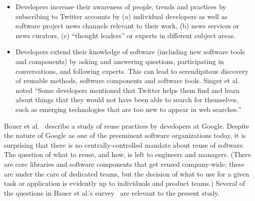 \documentclass{casicswhitepaper}
\begin{document}
\begin{itemize}

\item Developers increase their awareness of people, trends and practices by subscribing to Twitter accounts by (a) individual developers as well as software project news channels relevant to their work, (b) news services or news curators, (c) ``thought leaders'' or experts in different subject areas.  

\item Developers extend their knowledge of software (including new software tools and components) by asking and answering questions, participating in conversations, and following experts.  This can lead to serendipitous discovery of reusable methods, software components and software tools.  Singer et al. noted ``Some developers mentioned that Twitter helps them find and learn about things that they would not have been able to search for themselves, such as emerging technologies that are too new to appear in web searches.''

\end{itemize}

Bauer et al.~\cite{bauer2014exploratory} describe a study of reuse practices by developers at Google.  Despite the nature of Google as one of the preeminent software organizations today, it is surprising that there is no centrally-controlled mandate about reuse of software.  The question of what to reuse, and how, is left to engineers and managers.  (There are core libraries and software components that get reused company-wide; these are under the care of dedicated teams, but the decision of what to use for a given task or application is evidently up to individuals and product teams.)  Several of the questions in Bauer et al.'s survey~\cite{bauer2014exploratory} are relevant to the present study.
\end{document}
